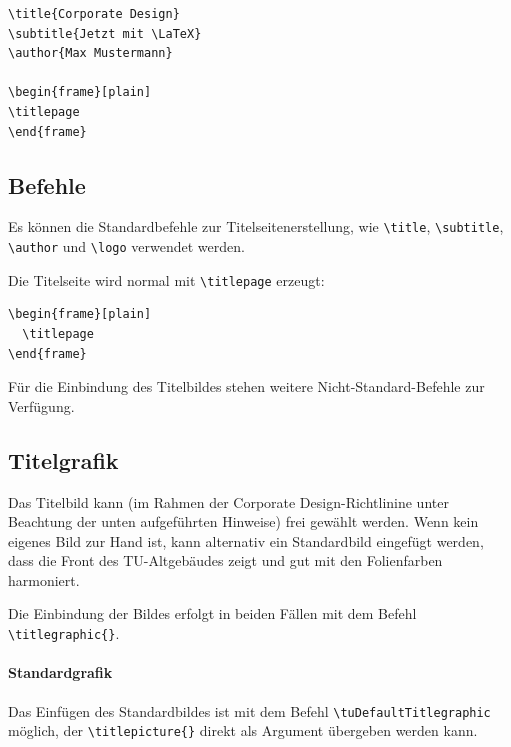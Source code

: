 \documentclass[cmyk,a4paper,colorscheme=green,TUBStitlepage=picture]{tubsreprt}
\begin{document}
\begin{minipage}{0.5\textwidth}
\begin{verbatim}
\title{Corporate Design}
\subtitle{Jetzt mit \LaTeX}
\author{Max Mustermann}

\begin{frame}[plain]
\titlepage
\end{frame}
\end{verbatim}
\end{minipage}
\begin{minipage}{0.5\textwidth}
\end{minipage}

\subsection{Befehle}

Es können die Standardbefehle zur Titelseitenerstellung, wie
\lstinline{\title},
\lstinline{\subtitle},
\lstinline{\author}
und \lstinline{\logo} verwendet werden.

Die Titelseite wird normal mit \lstinline{\titlepage} erzeugt:

\begin{lstlisting}
\begin{frame}[plain]
  \titlepage
\end{frame}
\end{lstlisting}

Für die Einbindung des Titelbildes stehen weitere Nicht-Standard-Befehle zur
Verfügung.


\subsection{Titelgrafik}

Das Titelbild kann (im Rahmen der Corporate Design-Richtlinine
unter Beachtung der unten aufgeführten Hinweise) frei gewählt werden.
Wenn kein eigenes Bild zur Hand ist, kann alternativ ein Standardbild eingefügt
werden, dass die Front des TU-Altgebäudes zeigt und gut mit den Folienfarben
harmoniert.

Die Einbindung der Bildes erfolgt in beiden Fällen mit dem Befehl
\lstinline!\titlegraphic{}!.

\paragraph{Standardgrafik}

Das Einfügen des Standardbildes ist mit dem Befehl
\linebreak\lstinline{\tuDefaultTitlegraphic} möglich,
der \lstinline!\titlepicture{}! direkt als Argument übergeben werden kann.
\end{document}
